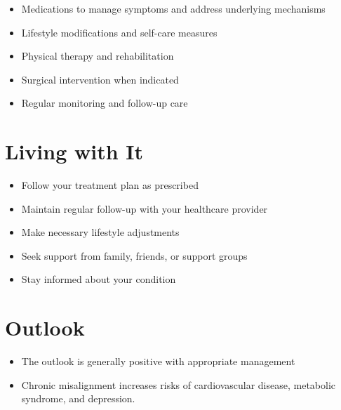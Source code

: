\begin{itemize}[noitemsep]
  \item Medications to manage symptoms and address underlying mechanisms
  \item Lifestyle modifications and self-care measures
  \item Physical therapy and rehabilitation
  \item Surgical intervention when indicated
  \item Regular monitoring and follow-up care
\end{itemize}
\section{Living with It}
\begin{itemize}[noitemsep]
  \item Follow your treatment plan as prescribed
  \item Maintain regular follow-up with your healthcare provider
  \item Make necessary lifestyle adjustments
  \item Seek support from family, friends, or support groups
  \item Stay informed about your condition
\end{itemize}
\section{Outlook}
\begin{itemize}[noitemsep]
  \item The outlook is generally positive with appropriate management
  \item Chronic misalignment increases risks of cardiovascular disease, metabolic syndrome, and depression.
\end{itemize}

